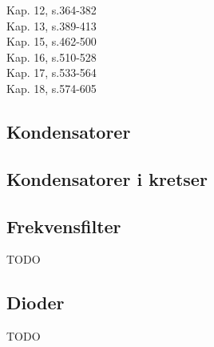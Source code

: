 Kap. 12, s.364-382 \\
Kap. 13, s.389-413 \\
Kap. 15, s.462-500 \\
Kap. 16, s.510-528 \\
Kap. 17, s.533-564 \\
Kap. 18, s.574-605

\subsection{Kondensatorer}


\subsection{Kondensatorer i kretser}


\subsection{Frekvensfilter}
TODO

\subsection{Dioder}
TODO
